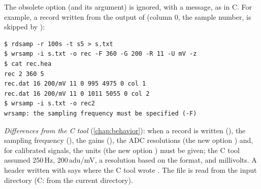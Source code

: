 The obsolete option  (and its argument) is ignored, with a message, as in C. For
example, a record written from the output of  (column 0, the sample number, is
skipped by ):
\begin{lstlisting}[style=text]
$ rdsamp -r 100s -t s5 > s.txt
$ wrsamp -i s.txt -o rec -F 360 -G 200 -R 11 -U mV -z
$ cat rec.hea
rec 2 360 5
rec.dat 16 200/mV 11 0 995 4975 0 col 1
rec.dat 16 200/mV 11 0 1011 5055 0 col 2
$ wrsamp -i s.txt -o rec2
wrsamp: the sampling frequency must be specified (-F)
\end{lstlisting}
\textit{Differences from the C tool} (\cref{chap:behavior}): when a record is written
(), the sampling frequency (), the gains (), the ADC resolutions
(the new option ) and, for calibrated signals, the units (the new option )
must be given; the C tool assumed 250\,Hz, 200\,adu/mV, a resolution based on the format,
and millivolts. A header written with  says  where the C tool
wrote . The  file is read from the input directory (C: from the current
directory).

